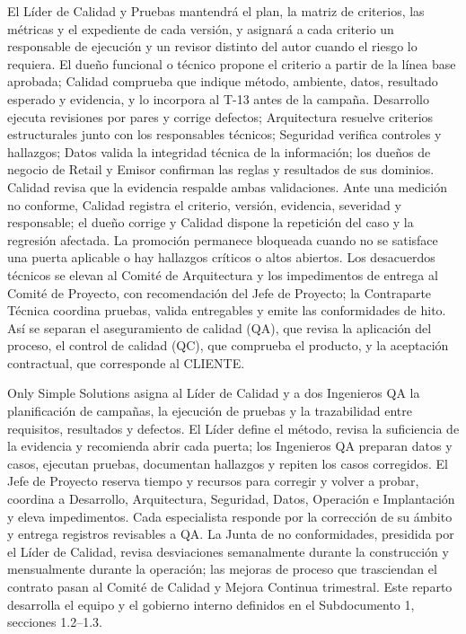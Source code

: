 \documentclass[11pt]{article}
\begin{document}
El Líder de Calidad y Pruebas mantendrá el plan, la matriz de criterios, las métricas y el expediente de cada versión, y asignará a cada criterio un responsable de ejecución y un revisor distinto del autor cuando el riesgo lo requiera. El dueño funcional o técnico propone el criterio a partir de la línea base aprobada; Calidad comprueba que indique método, ambiente, datos, resultado esperado y evidencia, y lo incorpora al T-13 antes de la campaña. Desarrollo ejecuta revisiones por pares y corrige defectos; Arquitectura resuelve criterios estructurales junto con los responsables técnicos; Seguridad verifica controles y hallazgos; Datos valida la integridad técnica de la información; los dueños de negocio de Retail y Emisor confirman las reglas y resultados de sus dominios. Calidad revisa que la evidencia respalde ambas validaciones. Ante una medición no conforme, Calidad registra el criterio, versión, evidencia, severidad y responsable; el dueño corrige y Calidad dispone la repetición del caso y la regresión afectada. La promoción permanece bloqueada cuando no se satisface una puerta aplicable o hay hallazgos críticos o altos abiertos. Los desacuerdos técnicos se elevan al Comité de Arquitectura y los impedimentos de entrega al Comité de Proyecto, con recomendación del Jefe de Proyecto; la Contraparte Técnica coordina pruebas, valida entregables y emite las conformidades de hito. Así se separan el aseguramiento de calidad (QA), que revisa la aplicación del proceso, el control de calidad (QC), que comprueba el producto, y la aceptación contractual, que corresponde al CLIENTE.

Only Simple Solutions asigna al Líder de Calidad y a dos Ingenieros QA la planificación de campañas, la ejecución de pruebas y la trazabilidad entre requisitos, resultados y defectos. El Líder define el método, revisa la suficiencia de la evidencia y recomienda abrir cada puerta; los Ingenieros QA preparan datos y casos, ejecutan pruebas, documentan hallazgos y repiten los casos corregidos. El Jefe de Proyecto reserva tiempo y recursos para corregir y volver a probar, coordina a Desarrollo, Arquitectura, Seguridad, Datos, Operación e Implantación y eleva impedimentos. Cada especialista responde por la corrección de su ámbito y entrega registros revisables a QA. La Junta de no conformidades, presidida por el Líder de Calidad, revisa desviaciones semanalmente durante la construcción y mensualmente durante la operación; las mejoras de proceso que trasciendan el contrato pasan al Comité de Calidad y Mejora Continua trimestral. Este reparto desarrolla el equipo y el gobierno interno definidos en el Subdocumento 1, secciones 1.2--1.3.
\end{document}
